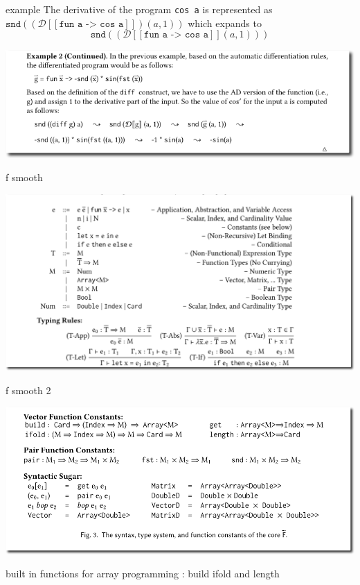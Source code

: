\documentclass[smaller]{beamer}
\begin{document}
\begin{frame}{example}
  The derivative of the program \texttt{cos a} is represented
  as $\texttt{snd} ((\mathcal D [[\texttt{fun a -> cos a}]]) (a,1)) $
  which expands to
  \begin{equation*}
    \texttt{snd} ((\mathcal D [[ \texttt{fun a -> cos a}]] (a,1)))
  \end{equation*}

\begin{center}
\includegraphics[width=.9\linewidth]{example2.png}
\end{center}

\end{frame}



\begin{frame}{f smooth}

\begin{center}
\includegraphics[width=.9\linewidth]{fsmooth1.png}
\end{center}
\end{frame}

\begin{frame}{f smooth 2}

\begin{center}
\includegraphics[width=.9\linewidth]{fsmooth2.png}
\end{center}
built in functions for array programming : build ifold and length
\end{frame}
\end{document}
